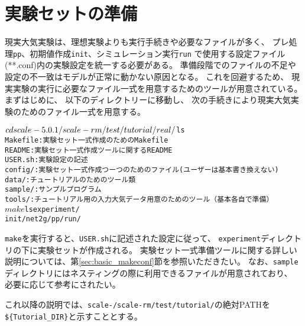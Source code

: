 \section{実験セットの準備} \label{sec:tutrial_real_prep}

現実大気実験は、理想実験よりも実行手続きや必要なファイルが多く、
プレ処理\verb|pp|、初期値作成\verb|init|、シミュレーション実行\verb|run|
で使用する設定ファイル(**.conf)内の実験設定を統一する必要がある。
準備段階でのファイルの不足や設定の不一致はモデルが正常に動かない原因となる。
これを回避するため、
現実実験の実行に必要なファイル一式を用意するためのツールが用意されている。
まずはじめに、
以下のディレクトリーに移動し、
次の手続きにより現実大気実験のためのファイル一式を用意する。
\begin{alltt}
 $ cd scale-{\version}/scale-rm/test/tutorial/real/
 $ ls 
    Makefile : 実験セット一式作成のためのMakefile
    README   : 実験セット一式作成ツールに関するREADME
    USER.sh  : 実験設定の記述
    config/  : 実験セット一式作成つーつのためのファイル(ユーザーは基本書き換えない)
    data/    : チュートリアルのためのツール類
    sample/  : サンプルプログラム
    tools/   : チュートリアル用の入力大気データ用意のためのツール（基本各自で準備）
 $ make
 $ ls experiment/
   init/  net2g/  pp/  run/
\end{alltt}
\verb|make|を実行すると、\verb|USER.sh|に記述された設定に従って、
\verb|experiment|ディレクトリの下に実験セットが作成される。
実験セット一式準備ツールに関する詳しい説明については、第\ref{sec:basic_makeconf}節を参照いただきたい。
なお、\verb|sample|ディレクトリにはネスティングの際に利用できるファイルが用意されており、
必要に応じて参考にされたい。

これ以降の説明では、\texttt{scale-{\version}/scale-rm/test/tutorial/}の絶対PATHを
\verb|${Tutorial_DIR}|と示すこととする。

